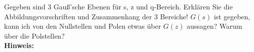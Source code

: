 \begin{question}[section=6,name={Gauß'sche Ebenen},difficulty=,type=mdl,tags={}]
	Gegeben sind 3 Gauß'sche Ebenen für s, z und q-Bereich. Erklären Sie die Abbildungsvorschriften und Zusammenhang der 3 Bereiche! $G(s)$ ist gegeben, kann ich von den Nullstellen und Polen etwas über $G(z)$ aussagen? Warum über die Polstellen?
	\\ \textbf{Hinweis:}\\
	
\end{question}
\begin{solution}
	
\end{solution}